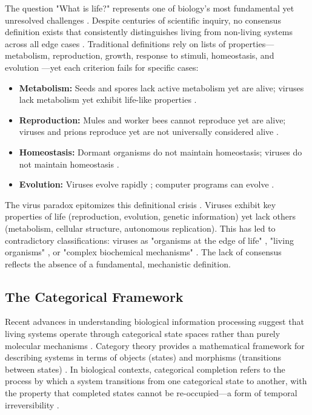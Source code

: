\documentclass[11pt]{article}
\begin{document}
The question "What is life?" represents one of biology's most fundamental yet unresolved challenges \citep{Schrodinger1944, Koshland2002, Cleland2019}. Despite centuries of scientific inquiry, no consensus definition exists that consistently distinguishes living from non-living systems across all edge cases \citep{Machery2012, Trifonov2011}. Traditional definitions rely on lists of properties—metabolism, reproduction, growth, response to stimuli, homeostasis, and evolution \citep{Koshland2002}—yet each criterion fails for specific cases:

\begin{itemize}
\item \textbf{Metabolism:} Seeds and spores lack active metabolism yet are alive; viruses lack metabolism yet exhibit life-like properties \citep{Raoult2004}.
\item \textbf{Reproduction:} Mules and worker bees cannot reproduce yet are alive; viruses and prions reproduce yet are not universally considered alive \citep{Moreira2009}.
\item \textbf{Homeostasis:} Dormant organisms do not maintain homeostasis; viruses do not maintain homeostasis \citep{Forterre2010}.
\item \textbf{Evolution:} Viruses evolve rapidly \citep{Holmes2009}; computer programs can evolve \citep{Adami1998}.
\end{itemize}

The virus paradox epitomizes this definitional crisis \citep{Raoult2004, Forterre2010, Moreira2009}. Viruses exhibit key properties of life (reproduction, evolution, genetic information) yet lack others (metabolism, cellular structure, autonomous replication). This has led to contradictory classifications: viruses as "organisms at the edge of life" \citep{Raoult2004}, "living organisms" \citep{Forterre2016}, or "complex biochemical mechanisms" \citep{Moreira2009}. The lack of consensus reflects the absence of a fundamental, mechanistic definition.

\subsection{The Categorical Framework}

Recent advances in understanding biological information processing suggest that living systems operate through categorical state spaces rather than purely molecular mechanisms \citep{Baez2018, Spivak2014}. Category theory provides a mathematical framework for describing systems in terms of objects (states) and morphisms (transitions between states) \citep{MacLane1971}. In biological contexts, categorical completion refers to the process by which a system transitions from one categorical state to another, with the property that completed states cannot be re-occupied—a form of temporal irreversibility \citep{Sachikonye2025a}.
\end{document}
